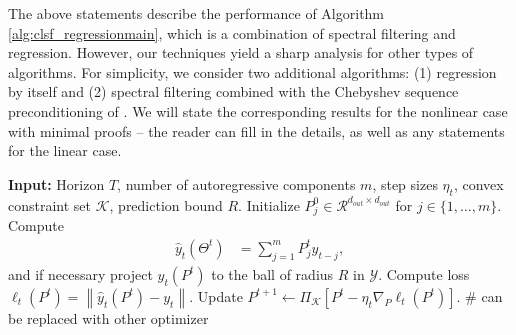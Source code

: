\documentclass[11pt]{article}
\def\K{{\mathcal K}}
\def\R{{\mathcal R}}
\newcommand{\norm}[1]{\left\lVert#1\right\rVert}
\def\R{\ensuremath{\mathcal R}}
\numberwithin{equation}{section}
\begin{document}
The above statements describe the performance of Algorithm \ref{alg:clsf_regressionmain}, which is a combination of spectral filtering and regression. However, our techniques yield a sharp analysis for other types of algorithms. For simplicity, we consider two additional algorithms: (1) regression by itself and (2) spectral filtering combined with the Chebyshev sequence preconditioning of \cite{marsden2025universalsequencepreconditioning}. We will state the corresponding results for the nonlinear case with minimal proofs -- the reader can fill in the details, as well as any statements for the linear case.


\begin{algorithm}[htb]
\caption{Regression}
\label{alg:appendixregression}
\begin{algorithmic}[1]
\STATE \textbf{Input:} Horizon \(T\), number of autoregressive components $m$, step sizes $\eta_t$, convex constraint set \(\K\), prediction bound $R$.
\STATE Initialize $P_j^0\in \R^{d_{out} \times d_{out}}$ for $j \in \{1, \ldots, m\}$. 
\STATE Compute \begin{align*}\hat{y}_t(\Theta^t) &=  \sum_{j=1}^{m}P_j^ty_{t-j} , \end{align*}
and if necessary project $\hat{y}_t(P^t)$ to the ball of radius $R$ in $\mathcal{Y}$.
\STATE Compute loss $\ell_t(P^t) = \norm{\hat{y}_t(P^t) - y_t}$.
\STATE Update $P^{t+1} \leftarrow \Pi_\K\left[P^t - \eta_t  \nabla_P \ell_t(P^t)\right]$. 
\hfill \textcolor[HTML]{408080}{\# can be replaced with other optimizer}
\ENDFOR
\end{algorithmic}
\end{algorithm}
\end{document}
